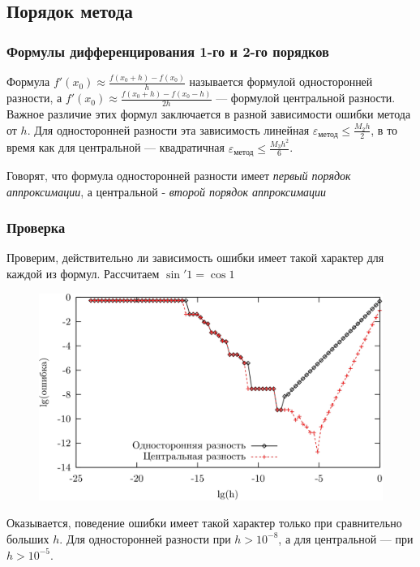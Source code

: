 \documentclass[aspectratio=43,unicode]{beamer}
\begin{document}
\subsection{Порядок метода}
\begin{frame}
\frametitle{Формулы дифференцирования 1-го и 2-го порядков}
	Формула $f'(x_0) \approx \frac{f(x_0+h) - f(x_0)}{h}$ называется формулой односторонней разности, а
	$f'(x_0) \approx \frac{f(x_0 + h) - f(x_0 - h)}{2h}$ --- формулой центральной разности. Важное различие этих формул заключается
	в разной зависимости ошибки метода от $h$. Для односторонней разности эта зависимость линейная
	$\varepsilon_{\text{метод}} \leqslant \frac{M_2 h}{2}$, в то время как для центральной --- квадратичная
	$\varepsilon_{\text{метод}} \leqslant \frac{M_3 h^2}{6}$.
	\pause

	Говорят, что формула односторонней разности имеет \emph{первый порядок аппроксимации},
	а центральной - \emph{второй порядок аппроксимации}
\end{frame}

\begin{frame}
\frametitle{Проверка}
	Проверим, действительно ли зависимость ошибки имеет такой характер для каждой из формул. Рассчитаем $\sin'1 = \cos 1$

	\begin{figure}%
	\centering
	\includegraphics[height=0.5\textheight]{diff.png}%
	\end{figure}

	Оказывается, поведение ошибки имеет такой характер только при сравнительно больших $h$. Для односторонней разности при $h > 10^{-8}$,
	а для центральной --- при $h > 10^{-5}$.
\end{frame}
\end{document}
